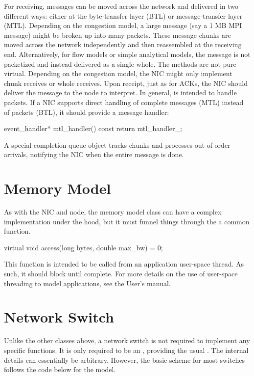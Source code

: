 For receiving, messages can be moved across the network and delivered in two different ways:
either at the byte-transfer layer (BTL) or message-transfer layer (MTL).
Depending on the congestion model, a large message (say a 1 MB MPI message) might be broken up into many packets.
These message chunks are moved across the network independently and then reassembled at the receiving end.
Alternatively, for flow models or simple analytical models, the message is not packetized and instead delivered as a single whole.
The methods are not pure virtual.  Depending on the congestion model,  the NIC might only implement chunk receives or whole receives.
Upon receipt, just as for ACKs, the NIC should deliver the message to the node to interpret.
In general,  is intended to handle packets. 
If a NIC supports direct handling of complete messages (MTL) instead of packets (BTL),
it should provide a message handler:

\begin{CppCode}
event_handler* mtl_handler() const {
  return mtl_handler_;
}
\end{CppCode}

A special completion queue object tracks chunks and processes out-of-order arrivals,
notifying the NIC when the entire message is done.

\section{Memory Model}\label{sec:memModel}
As with the NIC and node, the memory model class can have a complex implementation under the hood,
but it must funnel things through the a common function.

\begin{CppCode}
virtual void access(long bytes, double max_bw) = 0;
\end{CppCode}

This function is intended to be called from an application user-space thread.
As such, it should block until complete.
For more details on the use of user-space threading to model applications,
see the User's manual.


\section{Network Switch}\label{sec:networkSwitch}

Unlike the other classes above, a network switch is not required to implement any specific functions.
It is only required to be an , providing the usual .
The internal details can essentially be arbitrary.
However, the basic scheme for most switches follows the code below for the  model.


